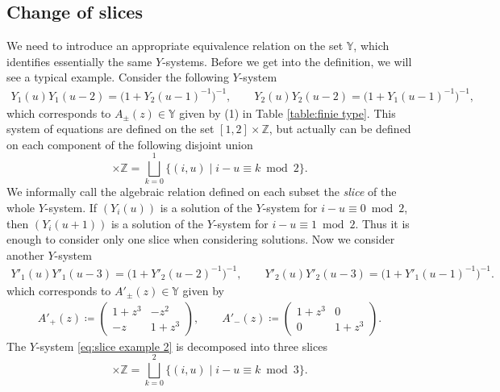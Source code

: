 \documentclass[pdftex]{sigma}
\numberwithin{equation}{section}
\theoremstyle{definition}
\begin{document}
\subsection{Change of slices}\label{section:change of slice}
We need to introduce an appropriate equivalence relation on the set $\mathbb{Y}$,
which identifies essentially the same $Y$-systems.
Before we get into the definition, we will see a typical example.
Consider the following $Y$-system
\begin{gather}\label{eq:slice example 1}
 Y_1 (u) Y_1 (u - 2) = \bigl(1 + Y_2(u-1)^{-1}\bigr)^{-1},\qquad Y_2 (u) Y_2 (u - 2) = \bigl(1 + Y_1(u-1)^{-1}\bigr)^{-1},
\end{gather}
which corresponds to $A_\pm (z) \in \mathbb{Y}$ given by (1) in Table \ref{table:finie type}.
This system of equations are defined on the set $[1,2] \times \mathbb{Z}$, but
actually can be defined on each component of the following disjoint union
\begin{equation*}
 [1,2] \times \mathbb{Z} = \bigsqcup_{k=0}^1 \{ (i, u) \mid i-u \equiv k \bmod 2 \}.
\end{equation*}
We informally call the algebraic relation defined on each subset
the \emph{slice} of the whole $Y$-system.
If $(Y_i(u))$ is a solution of the $Y$-system for $i-u \equiv 0 \bmod 2$,
then $(Y_i(u+1))$ is a solution of the $Y$-system for $i-u \equiv 1 \bmod 2$.
Thus it is enough to consider only one slice when considering solutions.
Now we consider another $Y$-system
\begin{gather}\label{eq:slice example 2}
Y'_1 (u) Y'_1 (u - 3) = \bigl(1 + Y'_2(u-2)^{-1}\bigr)^{-1},\qquad
 Y'_2 (u) Y'_2 (u - 3) = \bigl(1 + Y'_1(u-1)^{-1}\bigr)^{-1}.
\end{gather}
which corresponds to $A'_\pm (z) \in \mathbb{Y}$ given by
\begin{align*}
 A'_+(z)\coloneqq
 \begin{pmatrix}
 1 + z^3 & -z^2 \\
 -z & 1 + z^3
 \end{pmatrix},\qquad
 A'_-(z) \coloneqq
 \begin{pmatrix}
 1 + z^3 & 0 \\
 0 & 1 + z^3
 \end{pmatrix}.
\end{align*}
The $Y$-system \eqref{eq:slice example 2} is decomposed into three slices
\begin{equation*}
 [1,2] \times \mathbb{Z} =
 \bigsqcup_{k=0}^2 \{ (i, u) \mid i - u \equiv k \bmod 3 \}.
\end{equation*}
\end{document}
